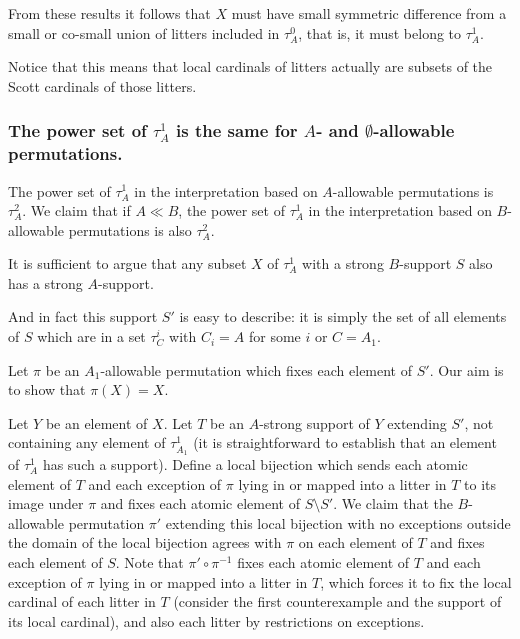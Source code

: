 \documentclass[12pt]{article}
\begin{document}
From these results it follows that $X$ must have small symmetric difference from a small or co-small union of litters included in $\tau^0_A$, that is, it must belong to $\tau^1_A$.

Notice that this means that local cardinals of litters actually are subsets of the Scott cardinals of those litters.

\newpage

\subsubsection{The power set of $\tau^1_A$ is the same for $A$- and $\emptyset$-allowable permutations.}

The power set of $\tau^1_A$ in the interpretation based on $A$-allowable permutations is $\tau^2_A$.  We claim that if $A \ll B$, the power set of  $\tau^1_A$ in
the interpretation based on $B$-allowable permutations is also $\tau^2_A$.

It is sufficient to argue that any subset $X$ of $\tau^1_A$ with a strong $B$-support $S$ also has a strong $A$-support.

And in fact this support $S'$ is easy to describe:  it is simply the set of all elements of $S$ which are in a set $\tau^i_C$ with $C_i = A$ for some $i$ or $C=A_1$.

Let $\pi$ be an $A_1$-allowable permutation which fixes each element of $S'$.  Our aim is to show that $\pi(X)=X$.

Let $Y$ be an element of $X$.  Let $T$ be an $A$-strong support of $Y$ extending $S'$, not containing any element of $\tau^1_{A_1}$ (it is straightforward to establish that
an element of $\tau^1_A$ has such a support).  Define a local bijection which sends each atomic element of $T$ and each exception of $\pi$ lying in or mapped into a litter in $T$ to its image under $\pi$
and fixes each atomic element of $S \setminus S'$.  We claim that the $B$-allowable permutation $\pi'$ extending this local bijection with no exceptions outside the domain of the local bijection  agrees with $\pi$ on each element of $T$ and fixes each element of $S$.  Note that $\pi' \circ \pi^{-1}$ fixes each atomic element of $T$ and each exception of $\pi$ lying in or mapped into a litter in $T$, which forces it to fix the local cardinal of each litter in $T$ (consider the first counterexample and the support of its local cardinal), and also each litter by restrictions on exceptions. 
\end{document}
